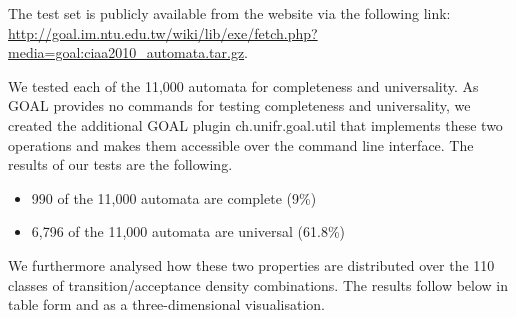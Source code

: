 The \goal{} test set is publicly available from the \goal{} website via the following link: \url{http://goal.im.ntu.edu.tw/wiki/lib/exe/fetch.php?media=goal:ciaa2010_automata.tar.gz}.

We tested each of the 11,000 automata for completeness and universality. As GOAL provides no commands for testing completeness and universality, we created the additional GOAL plugin \textsf{ch.unifr.goal.util} that implements these two operations and makes them accessible over the command line interface. The results of our tests are the following.

\begin{itemize}
\item 990 of the 11,000 automata are complete (9\%)
\item 6,796 of the 11,000 automata are universal (61.8\%)
\end{itemize}

We furthermore analysed how these two properties are distributed over the 110 classes of transition/acceptance density combinations. The results follow below in table form and as a three-dimensional visualisation.

